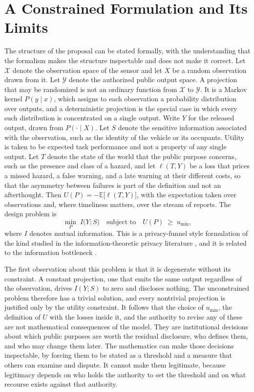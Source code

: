 \documentclass[11pt]{article}
\theoremstyle{definition}
\newcommand{\MI}{I}
\newcommand{\Obs}{\mathcal{X}}
\newcommand{\Out}{\mathcal{Y}}
\begin{document}
\section{A Constrained Formulation and Its Limits}

The structure of the proposal can be stated formally, with the understanding that the formalism makes the structure inspectable and does not make it correct. Let $\Obs$ denote the observation space of the sensor and let $X$ be a random observation drawn from it. Let $\Out$ denote the authorized public output space. A projection that may be randomized is not an ordinary function from $\Obs$ to $\Out$. It is a Markov kernel $P(y \mid x)$, which assigns to each observation a probability distribution over outputs, and a deterministic projection is the special case in which every such distribution is concentrated on a single output. Write $Y$ for the released output, drawn from $P(\cdot \mid X)$. Let $S$ denote the sensitive information associated with the observation, such as the identity of the vehicle or its occupants. Utility is taken to be expected task performance and not a property of any single output. Let $T$ denote the state of the world that the public purpose concerns, such as the presence and class of a hazard, and let $\ell(T,Y)$ be a loss that prices a missed hazard, a false warning, and a late warning at their different costs, so that the asymmetry between failures is part of the definition and not an afterthought. Then $U(P) = -\mathbb{E}\big[\ell(T,Y)\big]$, with the expectation taken over observations and, where timeliness matters, over the stream of reports. The design problem is
\[
\min_{P}\; \MI\big(Y;S\big)
\quad\text{subject to}\quad
U(P)\;\geq\;u_{\min},
\]
where $\MI$ denotes mutual information. This is a privacy-funnel style formulation of the kind studied in the information-theoretic privacy literature \cite{makhdoumi2014}, and it is related to the information bottleneck \cite{tishby1999}.

The first observation about this problem is that it is degenerate without its constraint. A constant projection, one that emits the same output regardless of the observation, drives $\MI(Y;S)$ to zero and discloses nothing. The unconstrained problem therefore has a trivial solution, and every nontrivial projection is justified only by the utility constraint. It follows that the choice of $u_{\min}$, the definition of $U$ with the losses inside it, and the authority to revise any of these are not mathematical consequences of the model. They are institutional decisions about which public purposes are worth the residual disclosure, who defines them, and who may change them later. The mathematics can make those decisions inspectable, by forcing them to be stated as a threshold and a measure that others can examine and dispute. It cannot make them legitimate, because legitimacy depends on who holds the authority to set the threshold and on what recourse exists against that authority.
\end{document}
